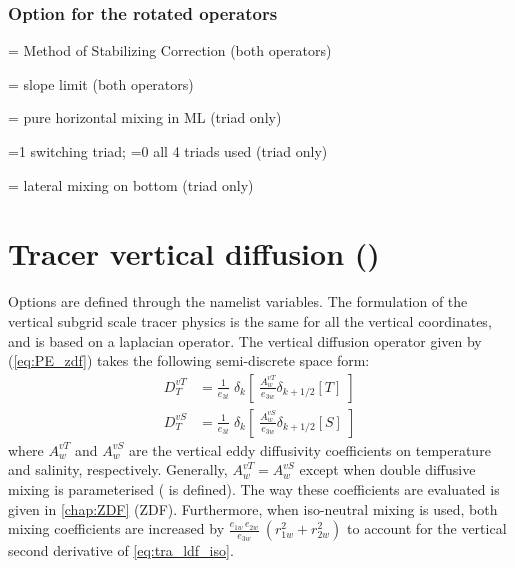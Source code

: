 \documentclass[../main/NEMO_manual]{subfiles}
\begin{document}
\subsubsection{Option for the rotated operators}
\label{subsec:TRA_ldf_options}

 = Method of Stabilizing Correction (both operators)

 = slope limit (both operators)

 = pure horizontal mixing in ML (triad only)

 =1 switching triad;
                   =0 all 4 triads used (triad only) 

 = lateral mixing on bottom (triad only)

\section{Tracer vertical diffusion (\protect{})}
\label{sec:TRA_zdf}


Options are defined through the  namelist variables.
The formulation of the vertical subgrid scale tracer physics is the same for all the vertical coordinates,
and is based on a laplacian operator.
The vertical diffusion operator given by (\autoref{eq:PE_zdf}) takes the following semi-discrete space form:
\[
  \begin{split}
    D^{vT}_T &= \frac{1}{e_{3t}} \; \delta_k \left[ \;\frac{A^{vT}_w}{e_{3w}}  \delta_{k+1/2}[T] \;\right]    \\
    D^{vS}_T &= \frac{1}{e_{3t}} \; \delta_k \left[ \;\frac{A^{vS}_w}{e_{3w}}  \delta_{k+1/2}[S] \;\right]
  \end{split}
\]
where $A_w^{vT}$ and $A_w^{vS}$ are the vertical eddy diffusivity coefficients on temperature and salinity,
respectively.
Generally, $A_w^{vT}=A_w^{vS}$ except when double diffusive mixing is parameterised (\ie {} is defined).
The way these coefficients are evaluated is given in \autoref{chap:ZDF} (ZDF).
Furthermore, when iso-neutral mixing is used, both mixing coefficients are increased by
$\frac{e_{1w}\,e_{2w} }{e_{3w} }\ \left( {r_{1w} ^2+r_{2w} ^2} \right)$ to account for
the vertical second derivative of \autoref{eq:tra_ldf_iso}.
\end{document}
